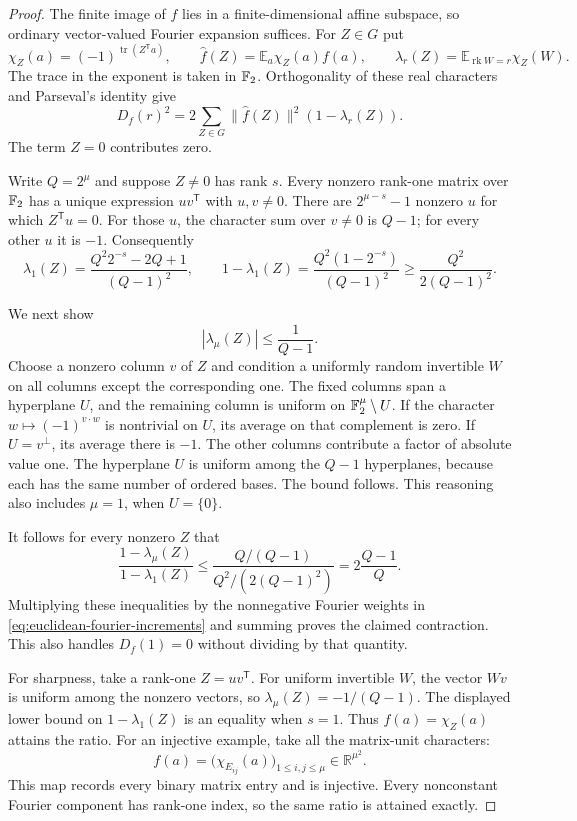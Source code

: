 \begin{proof}
The finite image of $f$ lies in a finite-dimensional affine
subspace, so ordinary vector-valued Fourier expansion suffices.
For $Z\in G$ put
\[
 \chi_Z(a)=(-1)^{\operatorname{tr}(Z^{\mathsf T}a)},\qquad
 \widehat f(Z)=\mathbb E_a\chi_Z(a)f(a),\qquad
 \lambda_r(Z)=\mathbb E_{\operatorname{rk}W=r}\chi_Z(W).
\]
The trace in the exponent is taken in $\mathbb F_2$.
Orthogonality of these real characters and Parseval's identity give
\begin{equation}\label{eq:euclidean-fourier-increments}
 D_f(r)^2=
 2\sum_{Z\in G}\|\widehat f(Z)\|^2(1-\lambda_r(Z)).
\end{equation}
The term $Z=0$ contributes zero.

Write $Q=2^\mu$ and suppose $Z\ne0$ has rank $s$.
Every nonzero rank-one matrix over $\mathbb F_2$ has a unique expression
$uv^{\mathsf T}$ with $u,v\ne0$.
There are $2^{\mu-s}-1$ nonzero $u$ for which
$Z^{\mathsf T}u=0$.  For those $u$, the character sum over
$v\ne0$ is $Q-1$; for every other $u$ it is $-1$.
Consequently
\[
 \lambda_1(Z)=
 \frac{Q^2 2^{-s}-2Q+1}{(Q-1)^2},\qquad
 1-\lambda_1(Z)=
 \frac{Q^2(1-2^{-s})}{(Q-1)^2}
 \geq\frac{Q^2}{2(Q-1)^2}.
\]

We next show
\[
 |\lambda_\mu(Z)|\leq\frac1{Q-1}.
\]
Choose a nonzero column $v$ of $Z$ and condition a uniformly
random invertible $W$ on all columns except the corresponding
one.  The fixed columns span a hyperplane $U$, and the remaining
column is uniform on $\mathbb F_2^\mu\setminus U$.
If the character $w\mapsto(-1)^{v\cdot w}$ is nontrivial on
$U$, its average on that complement is zero.
If $U=v^\perp$, its average there is $-1$.
The other columns contribute a factor of absolute value one.
The hyperplane $U$ is uniform among the $Q-1$ hyperplanes,
because each has the same number of ordered bases.  The bound
follows.  This reasoning also includes $\mu=1$, when $U=\{0\}$.

It follows for every nonzero $Z$ that
\[
 \frac{1-\lambda_\mu(Z)}{1-\lambda_1(Z)}
 \leq
 \frac{Q/(Q-1)}{Q^2/(2(Q-1)^2)}
 =2\frac{Q-1}{Q}.
\]
Multiplying these inequalities by the nonnegative Fourier
weights in \eqref{eq:euclidean-fourier-increments} and summing
proves the claimed contraction.  This also handles $D_f(1)=0$
without dividing by that quantity.

For sharpness, take a rank-one $Z=uv^{\mathsf T}$.
For uniform invertible $W$, the vector $Wv$ is uniform among
the nonzero vectors, so $\lambda_\mu(Z)=-1/(Q-1)$.
The displayed lower bound on $1-\lambda_1(Z)$ is an equality
when $s=1$.  Thus $f(a)=\chi_Z(a)$ attains the ratio.
For an injective example, take all the matrix-unit characters:
\[
 f(a)=\bigl(\chi_{E_{ij}}(a)\bigr)_{1\leq i,j\leq\mu}
       \in\mathbb R^{\mu^2}.
\]
This map records every binary matrix entry and is injective.
Every nonconstant Fourier component has rank-one index,
so the same ratio is attained exactly.
\end{proof}

